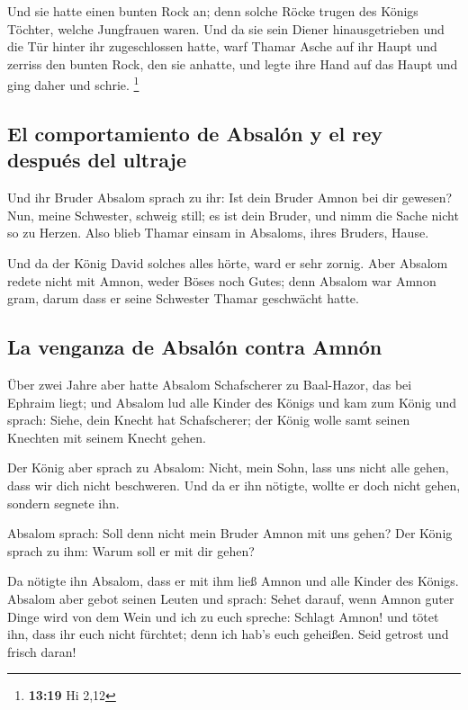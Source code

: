  Und sie hatte einen bunten Rock an; denn solche Röcke
trugen des Königs Töchter, welche Jungfrauen waren. Und da sie sein
Diener hinausgetrieben und die Tür hinter ihr zugeschlossen hatte,
 warf Thamar Asche auf ihr Haupt und zerriss den bunten
Rock, den sie anhatte, und legte ihre Hand auf das Haupt und ging daher
und schrie. \footnote{\textbf{13:19} Hi 2,12}

\hypertarget{el-comportamiento-de-absaluxf3n-y-el-rey-despuuxe9s-del-ultraje}{%
\subsection{El comportamiento de Absalón y el rey después del
ultraje}\label{el-comportamiento-de-absaluxf3n-y-el-rey-despuuxe9s-del-ultraje}}

 Und ihr Bruder Absalom sprach zu ihr: Ist dein Bruder
Amnon bei dir gewesen? Nun, meine Schwester, schweig still; es ist dein
Bruder, und nimm die Sache nicht so zu Herzen. Also blieb Thamar einsam
in Absaloms, ihres Bruders, Hause.

 Und da der König David solches alles hörte, ward er sehr
zornig. Aber Absalom redete nicht mit Amnon, weder Böses noch Gutes;
 denn Absalom war Amnon gram, darum dass er seine
Schwester Thamar geschwächt hatte.

\hypertarget{la-venganza-de-absaluxf3n-contra-amnuxf3n}{%
\subsection{La venganza de Absalón contra
Amnón}\label{la-venganza-de-absaluxf3n-contra-amnuxf3n}}

 Über zwei Jahre aber hatte Absalom Schafscherer zu
Baal-Hazor, das bei Ephraim liegt; und Absalom lud alle Kinder des
Königs  und kam zum König und sprach: Siehe, dein Knecht
hat Schafscherer; der König wolle samt seinen Knechten mit seinem Knecht
gehen.

 Der König aber sprach zu Absalom: Nicht, mein Sohn, lass
uns nicht alle gehen, dass wir dich nicht beschweren. Und da er ihn
nötigte, wollte er doch nicht gehen, sondern segnete ihn.

 Absalom sprach: Soll denn nicht mein Bruder Amnon mit
uns gehen? Der König sprach zu ihm: Warum soll er mit dir gehen?

 Da nötigte ihn Absalom, dass er mit ihm ließ Amnon und
alle Kinder des Königs.  Absalom aber gebot seinen Leuten
und sprach: Sehet darauf, wenn Amnon guter Dinge wird von dem Wein und
ich zu euch spreche: Schlagt Amnon! und tötet ihn, dass ihr euch nicht
fürchtet; denn ich hab's euch geheißen. Seid getrost und frisch daran!

